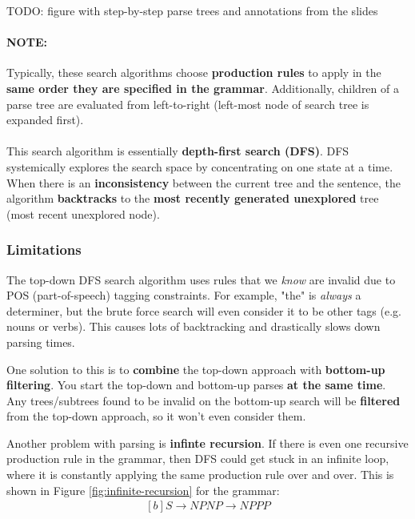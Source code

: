 \documentclass{article}
\begin{document}
TODO: figure with step-by-step parse trees and annotations from the slides

\paragraph{\textbf{NOTE: }} Typically, these search algorithms choose \textbf{production rules} to apply in the \textbf{same order they are specified in the grammar}. Additionally, children of a parse tree are evaluated from left-to-right (left-most node of search tree is expanded first). 
\paragraph{}

This search algorithm is essentially \textbf{depth-first search (DFS)}. DFS systemically explores the search space by concentrating on one state at a time. When there is an \textbf{inconsistency} between the current tree and the sentence, the algorithm \textbf{backtracks} to the \textbf{most recently generated unexplored} tree (most recent unexplored node).

\subsubsection{Limitations}

The top-down DFS search algorithm uses rules that we \textit{know} are invalid due to POS (part-of-speech) tagging constraints. For example, "the" is \textit{always} a determiner, but the brute force search will even consider it to be other tags (e.g. nouns or verbs). This causes lots of backtracking and drastically slows down parsing times.

One solution to this is to \textbf{combine} the top-down approach with \textbf{bottom-up filtering}. You start the top-down and bottom-up parses \textbf{at the same time}. Any trees/subtrees found to be invalid on the bottom-up search will be \textbf{filtered} from the top-down approach, so it won't even consider them.

Another problem with parsing is \textbf{infinte recursion}. If there is even one recursive production rule in the grammar, then DFS could get stuck in an infinite loop, where it is constantly applying the same production rule over and over. This is shown in Figure \ref{fig:infinite-recursion} for the grammar:
\begin{equation}
\begin{aligned}[b]
S \rightarrow NP
NP \rightarrow NP PP
\end{aligned}
\end{equation}
\end{document}
